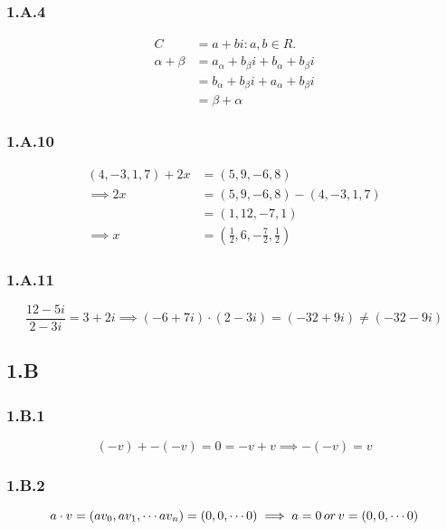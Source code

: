 \subsubsection*{1.A.4}
\begin{equation*}
    \begin{split}
C & ={a+bi:a,b \in R}. \\
\alpha + \beta & = a_\alpha +b_\beta i + b_\alpha + b_\beta i \\
& = b_\alpha + b_\beta i + a_\alpha +b_\beta i \\
& = \beta + \alpha
    \end{split}
\end{equation*}

\subsubsection*{1.A.10}
\begin{equation*}
    \begin{split}
        (4, -3, 1, 7) + 2x &= (5, 9, -6, 8) \\
        \implies  
        2x & = (5, 9, -6, 8) - (4, -3, 1, 7) \\
        & = (1, 12, -7, 1) \\
        \implies
        x &= (\frac{1}{2}, 6, -\frac{7}{2}, \frac{1}{2})
    \end{split}
\end{equation*}

\subsubsection*{1.A.11}
\begin{equation*}
\frac{12-5i}{2-3i} = 3+2i 
\implies
(-6+7i) \cdot (2-3i) = (-32+9i) \neq (-32-9i)
\end{equation*}

\subsection*{1.B}

\subsubsection*{1.B.1}
\begin{equation*}
    (-v) + -(-v) = 0 = -v + v \implies -(-v) = v
\end{equation*}

\subsubsection*{1.B.2}
\begin{equation*}
    a\cdot v = (av_0, av_1, \cdots av_n) = (0, 0, \cdots 0) \\
    \implies a = 0\, or\, v = (0, 0, \cdots 0)
\end{equation*}

